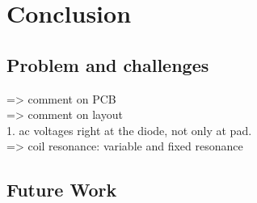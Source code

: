 \documentclass[UKenglish]{ifimaster}  %
\begin{document}
\chapter{Conclusion}
\section{Problem and challenges}

=> comment on PCB \\
=> comment on layout \\
	1. ac voltages right at the diode, not only at pad. \\
	
=> coil resonance: variable and fixed resonance \\

\section{Future Work}

\clearpage
\newpage

\end{document}

